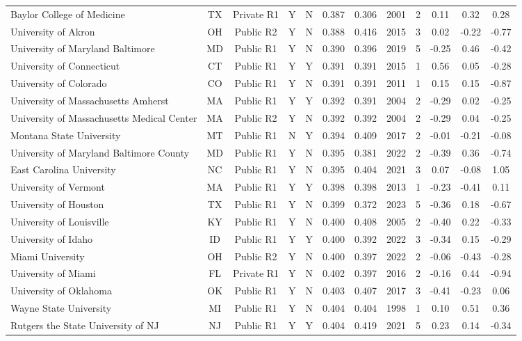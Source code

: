\begin{longtable}{@{}p{3.55cm}ccccccccccc@{}}
Baylor College of Medicine & TX & Private R1 & Y & N & 0.387 & 0.306 & 2001 & 2 & 0.11 & 0.32 & 0.28 \\
University of Akron & OH & Public R2 & Y & N & 0.388 & 0.416 & 2015 & 3 & 0.02 & -0.22 & -0.77 \\
University of Maryland Baltimore & MD & Public R1 & Y & N & 0.390 & 0.396 & 2019 & 5 & -0.25 & 0.46 & -0.42 \\
University of Connecticut & CT & Public R1 & Y & Y & 0.391 & 0.391 & 2015 & 1 & 0.56 & 0.05 & -0.28 \\
University of Colorado & CO & Public R1 & Y & N & 0.391 & 0.391 & 2011 & 1 & 0.15 & 0.15 & -0.87 \\
University of Massachusetts Amherst & MA & Public R1 & Y & Y & 0.392 & 0.391 & 2004 & 2 & -0.29 & 0.02 & -0.25 \\
University of Massachusetts Medical Center & MA & Public R2 & Y & N & 0.392 & 0.392 & 2004 & 2 & -0.29 & 0.04 & -0.25 \\
Montana State University & MT & Public R1 & N & Y & 0.394 & 0.409 & 2017 & 2 & -0.01 & -0.21 & -0.08 \\
University of Maryland Baltimore County & MD & Public R1 & Y & N & 0.395 & 0.381 & 2022 & 2 & -0.39 & 0.36 & -0.74 \\
East Carolina University & NC & Public R1 & Y & N & 0.395 & 0.404 & 2021 & 3 & 0.07 & -0.08 & 1.05 \\
University of Vermont & MA & Public R1 & Y & Y & 0.398 & 0.398 & 2013 & 1 & -0.23 & -0.41 & 0.11 \\
University of Houston & TX & Public R1 & Y & N & 0.399 & 0.372 & 2023 & 5 & -0.36 & 0.18 & -0.67 \\
University of Louisville & KY & Public R1 & Y & N & 0.400 & 0.408 & 2005 & 2 & -0.40 & 0.22 & -0.33 \\
University of Idaho & ID & Public R1 & Y & Y & 0.400 & 0.392 & 2022 & 3 & -0.34 & 0.15 & -0.29 \\
Miami University & OH & Public R2 & Y & N & 0.400 & 0.397 & 2022 & 2 & -0.06 & -0.43 & -0.28 \\
University of Miami & FL & Private R1 & Y & N & 0.402 & 0.397 & 2016 & 2 & -0.16 & 0.44 & -0.94 \\
University of Oklahoma & OK & Public R1 & Y & N & 0.403 & 0.407 & 2017 & 3 & -0.41 & -0.23 & 0.06 \\
Wayne State University & MI & Public R1 & Y & N & 0.404 & 0.404 & 1998 & 1 & 0.10 & 0.51 & 0.36 \\
Rutgers the State University of NJ & NJ & Public R1 & Y & Y & 0.404 & 0.419 & 2021 & 5 & 0.23 & 0.14 & -0.34 \\

\end{longtable}
